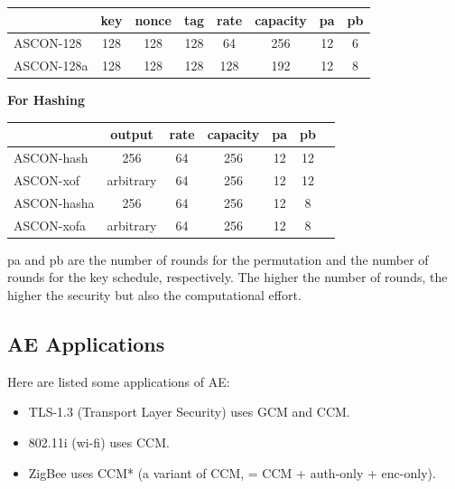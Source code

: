 \begin{table}[H]
    \centering
    \begin{tabular}{lccccccc}
        \toprule
        \textbf{} & \textbf{key} & \textbf{nonce} & \textbf{tag} & \textbf{rate} & \textbf{capacity} & \textbf{pa} & \textbf{pb} \\
        \midrule
        ASCON-128  & 128 & 128 & 128 & 64  & 256 & 12 & 6 \\
        ASCON-128a & 128 & 128 & 128 & 128 & 192 & 12 & 8 \\
        \bottomrule
    \end{tabular}
\end{table}

\begin{center}
    \textbf{For Hashing}
\end{center}
\begin{table}[H]
    \centering
    \begin{tabular}{lcccccc}
        \toprule
        \textbf{} & \textbf{output} & \textbf{rate} & \textbf{capacity} & \textbf{pa} & \textbf{pb} \\
        \midrule
        ASCON-hash  & 256       & 64  & 256 & 12 & 12 \\
        ASCON-xof   & arbitrary & 64  & 256 & 12 & 12 \\
        ASCON-hasha & 256       & 64  & 256 & 12 & 8  \\
        ASCON-xofa  & arbitrary & 64  & 256 & 12 & 8  \\
        \bottomrule
    \end{tabular}
\end{table}
\begin{tcolorbox}[colback=blue!10!white, colframe=blue!50!white]
pa and pb are the number of rounds for the permutation and the number of rounds for the key schedule, respectively. The higher the number of rounds, the higher the security but also the computational effort.
\end{tcolorbox}

\subsection{AE Applications}
Here are listed some applications of AE:
\begin{itemize}
    \item TLS-1.3 (Transport Layer Security) uses GCM and CCM.
    \item 802.11i (wi-fi) uses CCM.
    \item ZigBee uses CCM* (a variant of CCM, = CCM + auth-only + enc-only).
\end{itemize}

